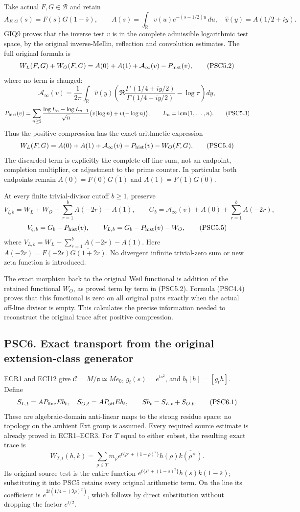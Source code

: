 Take actual \(F,G\in\mathcal B\) and retain \[
A_{F,G}(s)=F(s)\overline{G(1-\overline s)},\qquad
A(s)=\int_{\mathbb R}v(u)e^{-(s-1/2)u}\,du,
\quad\widehat v(y)=A(1/2+iy).
\tag{PSC5.1}
\] GIQ9 proves that the inverse test \(v\) is in the complete admissible
logarithmic test space, by the original inverse-Mellin, reflection and
convolution estimates. The full original formula is \[
W_L(F,G)+W_O(F,G)
=A(0)+A(1)+\mathcal A_\infty(v)-P_{\rm hist}(v),
\tag{PSC5.2}
\] where no term is changed: \[
\mathcal A_\infty(v)=\frac1{2\pi}\int_{\mathbb R}\widehat v(y)
\left(\Re\frac{\Gamma'(1/4+iy/2)}{\Gamma(1/4+iy/2)}-\log\pi\right)dy,
\] \[
P_{\rm hist}(v)=\sum_{n\ge2}\frac{\log L_n-\log L_{n-1}}{\sqrt n}
\bigl(v(\log n)+v(-\log n)\bigr),\qquad L_n=\operatorname{lcm}(1,\ldots,n).
\tag{PSC5.3}
\] Thus the positive compression has the exact arithmetic expression \[
W_L(F,G)=A(0)+A(1)+\mathcal A_\infty(v)-P_{\rm hist}(v)-W_O(F,G).
\tag{PSC5.4}
\] The discarded term is explicitly the complete off-line sum, not an
endpoint, completion multiplier, or adjustment to the prime counter. In
particular both endpoints remain \(A(0)=F(0)\overline{G(1)}\) and
\(A(1)=F(1)\overline{G(0)}\).

At every finite trivial-divisor cutoff \(b\ge1\), preserve \[
V_{\zeta,b}=W_L+W_O+\sum_{r=1}^b A(-2r)-A(1),\qquad
G_b=\mathcal A_\infty(v)+A(0)+\sum_{r=1}^b A(-2r),
\] \[
V_{\zeta,b}=G_b-P_{\rm hist}(v),\qquad
V_{L,b}=G_b-P_{\rm hist}(v)-W_O,
\tag{PSC5.5}
\] where \(V_{L,b}=W_L+\sum_{r=1}^bA(-2r)-A(1)\). Here
\(A(-2r)=F(-2r)\overline{G(1+2r)}\). No divergent infinite trivial-zero
sum or new zeta function is introduced.

The exact morphism back to the original Weil functional is addition of
the retained functional \(W_O\), as proved term by term in (PSC5.2).
Formula (PSC4.4) proves that this functional is zero on all original
pairs exactly when the actual off-line divisor is empty. This calculates
the precise information needed to reconstruct the original trace after
positive compression.

\subsection{PSC6. Exact transport from the original extension-class
generator}\label{psc6.-exact-transport-from-the-original-extension-class-generator}

ECR1 and ECI12 give \(\mathscr C=M/\mathfrak a\simeq Me_0\),
\(g_t(s)=e^{ts^2}\), and \(b_t[h]=[g_th]\). Define \[
S_{L,t}=AP_{\rm line}Eb_t,\quad S_{O,t}=AP_{\rm off}Eb_t,
\qquad Sb_t=S_{L,t}+S_{O,t}.
\tag{PSC6.1}
\] These are algebraic-domain anti-linear maps to the strong residue
space; no topology on the ambient Ext group is assumed. Every required
source estimate is already proved in ECR1--ECR3. For \(T\) equal to
either subset, the resulting exact trace is \[
W_{T,t}(h,k)=\sum_{\rho\in T}m_\rho
e^{t\{\rho^2+(1-\rho)^2\}}h(\rho)\overline{k(\rho^\#)}.
\tag{PSC6.2}
\] Its original source test is the entire function
\(e^{t\{s^2+(1-s)^2\}}h(s)\overline{k(1-\overline s)}\); substituting it
into PSC5 retains every original arithmetic term. On the line its
coefficient is \(e^{2t(1/4-(\Im\rho)^2)}\), which follows by direct
substitution without dropping the factor \(e^{t/2}\).

